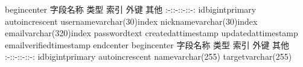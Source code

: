 \markdownRendererDocumentBegin
\markdownRendererBackslash{}begin\markdownRendererLeftBrace{}center\markdownRendererRightBrace{}\markdownRendererInterblockSeparator
{}\markdownRendererPipe{} 字段名称 \markdownRendererPipe{} 类型 \markdownRendererPipe{} 索引 \markdownRendererPipe{} 外键 \markdownRendererPipe{} 其他 \markdownRendererPipe{} \markdownRendererPipe{}:-:\markdownRendererPipe{}:-:\markdownRendererPipe{}:-:\markdownRendererPipe{}:-:\markdownRendererPipe{} \markdownRendererPipe{}id\markdownRendererPipe{}bigint\markdownRendererPipe{}primary\markdownRendererPipe{}\markdownRendererPipe{} auto\markdownRendererBackslash{}\markdownRendererUnderscore{}increscent\markdownRendererPipe{} \markdownRendererPipe{}username\markdownRendererPipe{}varchar(30)\markdownRendererPipe{}index\markdownRendererPipe{}\markdownRendererPipe{}\markdownRendererPipe{} \markdownRendererPipe{}nickname\markdownRendererPipe{}varchar(30)\markdownRendererPipe{}index\markdownRendererPipe{}\markdownRendererPipe{}\markdownRendererPipe{} \markdownRendererPipe{}email\markdownRendererPipe{}varchar(320)\markdownRendererPipe{}index\markdownRendererPipe{}\markdownRendererPipe{}\markdownRendererPipe{} \markdownRendererPipe{}password\markdownRendererPipe{}text\markdownRendererPipe{}\markdownRendererPipe{}\markdownRendererPipe{}\markdownRendererPipe{} \markdownRendererPipe{}created\markdownRendererBackslash{}\markdownRendererUnderscore{}at\markdownRendererPipe{}timestamp\markdownRendererPipe{}\markdownRendererPipe{}\markdownRendererPipe{}\markdownRendererPipe{} \markdownRendererPipe{}updated\markdownRendererBackslash{}\markdownRendererUnderscore{}at\markdownRendererPipe{}timestamp\markdownRendererPipe{}\markdownRendererPipe{}\markdownRendererPipe{}\markdownRendererPipe{} \markdownRendererPipe{}email\markdownRendererBackslash{}\markdownRendererUnderscore{}verified\markdownRendererPipe{}timestamp\markdownRendererPipe{}\markdownRendererPipe{}\markdownRendererPipe{}\markdownRendererPipe{}\markdownRendererInterblockSeparator
{}\markdownRendererBackslash{}end\markdownRendererLeftBrace{}center\markdownRendererRightBrace{}\markdownRendererInterblockSeparator
{}\markdownRendererInterblockSeparator
{}\markdownRendererBackslash{}begin\markdownRendererLeftBrace{}center\markdownRendererRightBrace{}\markdownRendererInterblockSeparator
{}\markdownRendererPipe{} 字段名称 \markdownRendererPipe{} 类型 \markdownRendererPipe{} 索引 \markdownRendererPipe{} 外键 \markdownRendererPipe{} 其他 \markdownRendererPipe{} \markdownRendererPipe{}:-:\markdownRendererPipe{}:-:\markdownRendererPipe{}:-:\markdownRendererPipe{}:-:\markdownRendererPipe{} \markdownRendererPipe{}id\markdownRendererPipe{}bigint\markdownRendererPipe{}primary\markdownRendererPipe{}\markdownRendererPipe{} auto\markdownRendererBackslash{}\markdownRendererUnderscore{}increscent\markdownRendererPipe{} \markdownRendererPipe{}name\markdownRendererPipe{}varchar(255)\markdownRendererPipe{}\markdownRendererPipe{}\markdownRendererPipe{}\markdownRendererPipe{} \markdownRendererPipe{}target\markdownRendererPipe{}varchar(255)\markdownRendererPipe{}\markdownRendererPipe{}\markdownRendererPipe{}\markdownRendererPipe{}\markdownRendererInterblockSeparator

